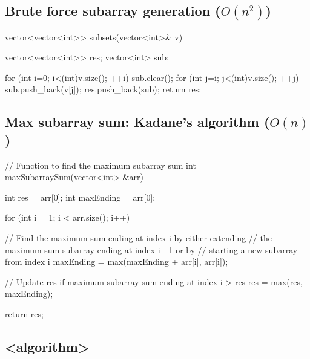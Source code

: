 \documentclass{report}
\begin{document}
\pagebreak 
{}
\bigbreak \noindent 
\subsection{Brute force subarray generation ($O(n^{2})$)}
\bigbreak \noindent 
\begin{cppcode}
    vector<vector<int>> subsets(vector<int>& v) {
        vector<vector<int>> res;
        vector<int> sub;

        for (int i=0; i<(int)v.size(); ++i) {
            sub.clear();
            for (int j=i; j<(int)v.size(); ++j) {
                sub.push_back(v[j]);
                res.push_back(sub);
            }
        }
        return res;
    }
\end{cppcode}
\bigbreak \noindent 
\subsection{Max subarray sum: Kadane's algorithm ($O(n)$)}
\bigbreak \noindent 
\begin{cppcode}
// Function to find the maximum subarray sum
int maxSubarraySum(vector<int> &arr) {
    int res = arr[0];
    int maxEnding = arr[0];

    for (int i = 1; i < arr.size(); i++) {
      
        // Find the maximum sum ending at index i by either extending 
        // the maximum sum subarray ending at index i - 1 or by
        // starting a new subarray from index i
        maxEnding = max(maxEnding + arr[i], arr[i]);
      
        // Update res if maximum subarray sum ending at index i > res
        res = max(res, maxEnding);
    }
    return res;
}
\end{cppcode}

\pagebreak 
{}
\bigbreak \noindent 




\pagebreak 
{}
\bigbreak \noindent 
\subsection{<algorithm>}
\bigbreak \noindent 
\end{document}
